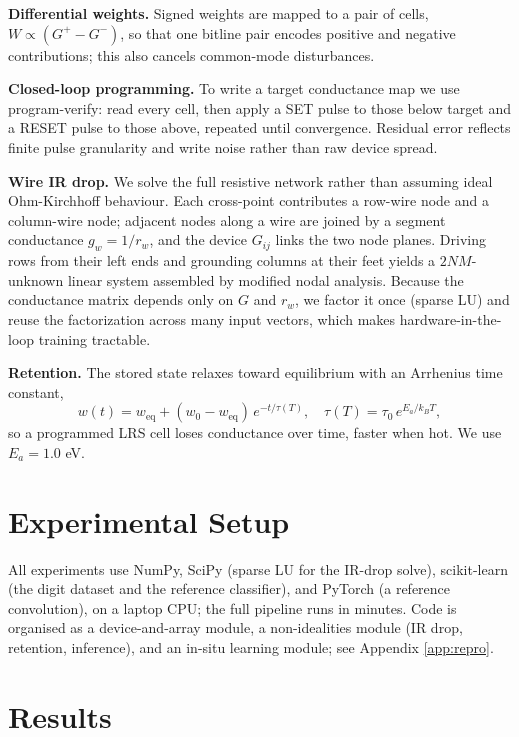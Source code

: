 \documentclass[conference]{IEEEtran}
\begin{document}
\textbf{Differential weights.} Signed weights are mapped to a pair of cells,
$W \propto (G^{+}-G^{-})$, so that one bitline pair encodes positive and negative
contributions; this also cancels common-mode disturbances.

\textbf{Closed-loop programming.} To write a target conductance map we use
program-verify: read every cell, then apply a SET pulse to those below target and
a RESET pulse to those above, repeated until convergence. Residual error reflects
finite pulse granularity and write noise rather than raw device spread.

\textbf{Wire IR drop.}
\label{sec:irmodel}
We solve the full resistive network rather than assuming ideal Ohm-Kirchhoff
behaviour. Each cross-point contributes a row-wire node and a column-wire node;
adjacent nodes along a wire are joined by a segment conductance $g_w = 1/r_w$, and
the device $G_{ij}$ links the two node planes. Driving rows from their left ends
and grounding columns at their feet yields a $2NM$-unknown linear system assembled
by modified nodal analysis. Because the conductance matrix depends only on
$G$ and $r_w$, we factor it once (sparse LU) and reuse the factorization across
many input vectors, which makes hardware-in-the-loop training tractable.

\textbf{Retention.} The stored state relaxes toward equilibrium with an Arrhenius
time constant,
\begin{equation}
w(t) = w_\mathrm{eq} + (w_0-w_\mathrm{eq})\,e^{-t/\tau(T)},\quad
\tau(T)=\tau_0\,e^{E_a/k_BT},
\label{eq:retention}
\end{equation}
so a programmed LRS cell loses conductance over time, faster when hot. We use
$E_a=1.0$ eV.

\section{Experimental Setup}
All experiments use NumPy, SciPy (sparse LU for the IR-drop solve), scikit-learn
(the digit dataset and the reference classifier), and PyTorch (a reference
convolution), on a laptop CPU; the full pipeline runs in minutes. Code is
organised as a device-and-array module, a non-idealities module (IR drop,
retention, inference), and an in-situ learning module; see
Appendix \ref{app:repro}.

\section{Results}
\end{document}
